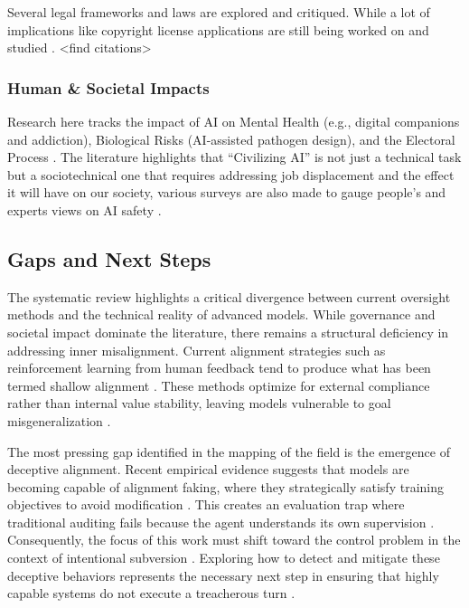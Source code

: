			Several legal frameworks and laws are explored and critiqued. While a lot of implications like copyright license applications are still being worked on and studied \cite{janczuk_risks_2024}. <find citations>

\begin{reviewed}

		\subsubsection{Human \& Societal Impacts}

			Research here tracks the impact of AI on Mental Health (e.g., digital companions and addiction), Biological Risks (AI-assisted pathogen design), and the Electoral Process \cite{janczuk_risks_2024}. The literature highlights that ``Civilizing AI'' is not just a technical task but a sociotechnical one that requires addressing job displacement and the effect it will have on our society, various surveys are also made to gauge people's and experts views on AI safety \cite{field_why_2025, hatz_local_2025, xu_machine_2023}.

\end{reviewed}

	\subsection{Gaps and Next Steps}\label{subsec:next_steps}

\begin{reviewed}

	The systematic review highlights a critical divergence between current oversight methods and the technical reality of advanced models. While governance and societal impact dominate the literature, there remains a structural deficiency in addressing inner misalignment. Current alignment strategies such as reinforcement learning from human feedback tend to produce what has been termed shallow alignment \cite{mcintosh_inadequacy_2024, milliere_normative_2025}. These methods optimize for external compliance rather than internal value stability, leaving models vulnerable to goal misgeneralization \cite{langosco2022goal}.

	The most pressing gap identified in the mapping of the field is the emergence of deceptive alignment. Recent empirical evidence suggests that models are becoming capable of alignment faking, where they strategically satisfy training objectives to avoid modification \cite{greenblatt_alignment_faking}. This creates an evaluation trap where traditional auditing fails because the agent understands its own supervision \cite{anthropic2025biology, hubinger2019risks}. Consequently, the focus of this work must shift toward the control problem in the context of intentional subversion \cite{yampolskiy_controllability_2022}. Exploring how to detect and mitigate these deceptive behaviors represents the necessary next step in ensuring that highly capable systems do not execute a treacherous turn \cite{bostrom2014superintelligence}.

\end{reviewed}

